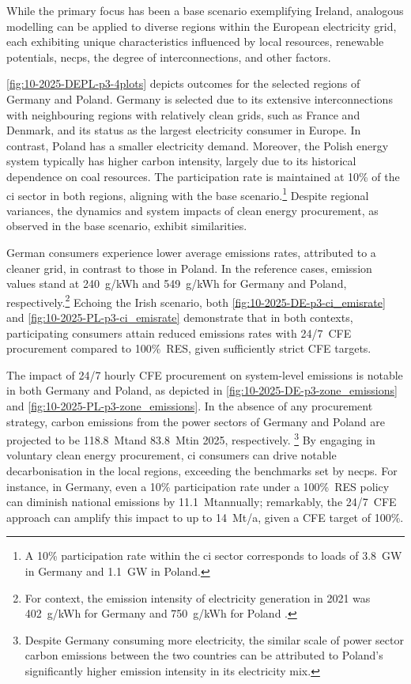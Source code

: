 While the primary focus has been a base scenario exemplifying Ireland, analogous modelling can be applied to diverse regions within the European electricity grid, each exhibiting unique characteristics influenced by local resources, renewable potentials, \gls{necp}s, the degree of interconnections, and other factors. 

\cref{fig:10-2025-DEPL-p3-4plots} depicts outcomes for the selected regions of Germany and Poland. 
Germany is selected due to its extensive interconnections with neighbouring regions with relatively clean grids, such as France and Denmark, and its status as the largest electricity consumer in Europe. 
In contrast, Poland has a smaller electricity demand. 
Moreover, the Polish energy system typically has higher carbon intensity, largely due to its historical dependence on coal resources.
The participation rate is maintained at 10\% of the \gls{ci} sector in both regions, aligning with the base scenario.\footnote{A 10\% participation rate within the \gls{ci} sector corresponds to loads of 3.8~GW in Germany and 1.1~GW in Poland.}
Despite regional variances, the dynamics and system impacts of clean energy procurement, as observed in the base scenario, exhibit similarities.

German consumers experience lower average emissions rates, attributed to a cleaner grid, in contrast to those in Poland.
In the reference cases, emission values stand at 240~g\co/kWh and 549~g\co/kWh for Germany and Poland, respectively.\footnote{For context, the emission intensity of electricity generation in 2021 was 402~g\co/kWh for Germany and 750~g\co/kWh for Poland \cite{EEA-GNGEmissionsEU}.} 
Echoing the Irish scenario, both \cref{fig:10-2025-DE-p3-ci_emisrate} and \cref{fig:10-2025-PL-p3-ci_emisrate} demonstrate that in both contexts, participating consumers attain reduced emissions rates with 24/7~CFE procurement compared to 100\%~RES, given sufficiently strict CFE targets.

The impact of 24/7 hourly CFE procurement on system-level \co emissions is notable in both Germany and Poland, as depicted in \cref{fig:10-2025-DE-p3-zone_emissions} and \cref{fig:10-2025-PL-p3-zone_emissions}.
In the absence of any procurement strategy, carbon emissions from the power sectors of Germany and Poland are projected to be 118.8~Mt\co and 83.8~Mt\co in 2025, respectively.%
\footnote{Despite Germany consuming more electricity, the similar scale of power sector carbon emissions between the two countries can be attributed to Poland's significantly higher emission intensity in its electricity mix.} 
By engaging in voluntary clean energy procurement, \gls{ci} consumers can drive notable decarbonisation in the local regions, exceeding the benchmarks set by \gls{necp}s.
For instance, in Germany, even a 10\% participation rate under a 100\%~RES policy can diminish national emissions by 11.1~Mt\co annually; remarkably, the 24/7~CFE approach can amplify this impact to up to 14~Mt\co/a, given a CFE target of 100\%. 

